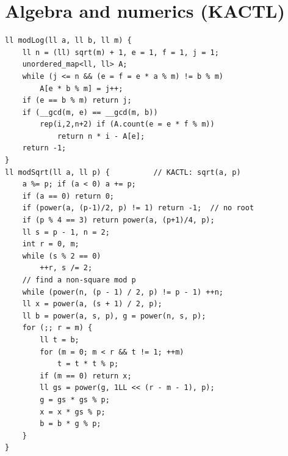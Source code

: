 \section{Algebra and numerics (KACTL)}


\begin{lstlisting}
ll modLog(ll a, ll b, ll m) {
    ll n = (ll) sqrt(m) + 1, e = 1, f = 1, j = 1;
    unordered_map<ll, ll> A;
    while (j <= n && (e = f = e * a % m) != b % m)
        A[e * b % m] = j++;
    if (e == b % m) return j;
    if (__gcd(m, e) == __gcd(m, b))
        rep(i,2,n+2) if (A.count(e = e * f % m))
            return n * i - A[e];
    return -1;
}
ll modSqrt(ll a, ll p) {          // KACTL: sqrt(a, p)
    a %= p; if (a < 0) a += p;
    if (a == 0) return 0;
    if (power(a, (p-1)/2, p) != 1) return -1;  // no root
    if (p % 4 == 3) return power(a, (p+1)/4, p);
    ll s = p - 1, n = 2;
    int r = 0, m;
    while (s % 2 == 0)
        ++r, s /= 2;
    // find a non-square mod p
    while (power(n, (p - 1) / 2, p) != p - 1) ++n;
    ll x = power(a, (s + 1) / 2, p);
    ll b = power(a, s, p), g = power(n, s, p);
    for (;; r = m) {
        ll t = b;
        for (m = 0; m < r && t != 1; ++m)
            t = t * t % p;
        if (m == 0) return x;
        ll gs = power(g, 1LL << (r - m - 1), p);
        g = gs * gs % p;
        x = x * gs % p;
        b = b * g % p;
    }
}
\end{lstlisting}

